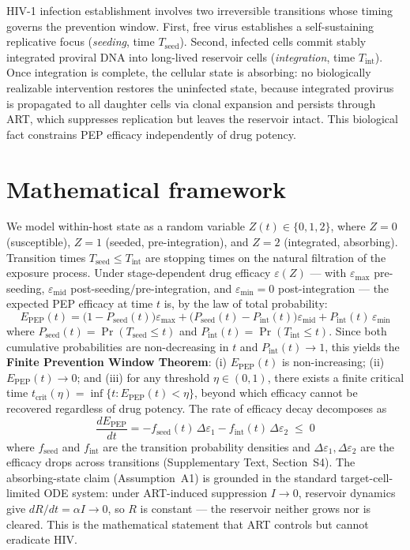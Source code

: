 \documentclass[10pt,letterpaper]{article}
\theoremstyle{definition}
\theoremstyle{remark}
\newcommand{\Tseed}{T_{\text{seed}}}
\newcommand{\Tint}{T_{\text{int}}}
\newcommand{\Pseed}{P_{\text{seed}}}
\newcommand{\Pint}{P_{\text{int}}}
\newcommand{\Epep}{E_{\text{PEP}}}
\newcommand{\tcrit}{t_{\text{crit}}}
\newcommand{\emax}{\varepsilon_{\max}}
\newcommand{\emid}{\varepsilon_{\text{mid}}}
\newcommand{\emin}{\varepsilon_{\min}}
\begin{document}
HIV-1 infection establishment involves two irreversible transitions whose timing governs the prevention window. First, free virus establishes a self-sustaining replicative focus (\emph{seeding}, time $\Tseed$). Second, infected cells commit stably integrated proviral DNA into long-lived reservoir cells (\emph{integration}, time $\Tint$). Once integration is complete, the cellular state is absorbing: no biologically realizable intervention restores the uninfected state, because integrated provirus is propagated to all daughter cells via clonal expansion\cite{chun1995,siliciano2005} and persists through ART, which suppresses replication but leaves the reservoir intact\cite{perelson1997}. This biological fact constrains PEP efficacy independently of drug potency.


\section*{Mathematical framework}

We model within-host state as a random variable $Z(t) \in \{0, 1, 2\}$, where $Z=0$ (susceptible), $Z=1$ (seeded, pre-integration), and $Z=2$ (integrated, absorbing). Transition times $\Tseed \leq \Tint$ are stopping times on the natural filtration of the exposure process. Under stage-dependent drug efficacy $\varepsilon(Z)$ --- with $\emax$ pre-seeding, $\emid$ post-seeding/pre-integration, and $\emin = 0$ post-integration --- the expected PEP efficacy at time $t$ is, by the law of total probability:
\begin{equation}
\Epep(t) = \big(1 - \Pseed(t)\big)\emax + \big(\Pseed(t) - \Pint(t)\big)\emid + \Pint(t)\,\emin
\label{eq:master}
\end{equation}
where $\Pseed(t) = \Pr(\Tseed \leq t)$ and $\Pint(t) = \Pr(\Tint \leq t)$. Since both cumulative probabilities are non-decreasing in $t$ and $\Pint(t) \to 1$, this yields the \textbf{Finite Prevention Window Theorem}: (i) $\Epep(t)$ is non-increasing; (ii) $\Epep(t) \to 0$; and (iii) for any threshold $\eta \in (0,1)$, there exists a finite critical time $\tcrit(\eta) = \inf\{t : \Epep(t) < \eta\}$, beyond which efficacy cannot be recovered regardless of drug potency. The rate of efficacy decay decomposes as
\begin{equation}
\frac{d\Epep}{dt} = -f_{\text{seed}}(t)\,\Delta\varepsilon_{1} - f_{\text{int}}(t)\,\Delta\varepsilon_{2} \;\leq\; 0
\label{eq:hazard}
\end{equation}
where $f_{\text{seed}}$ and $f_{\text{int}}$ are the transition probability densities and $\Delta\varepsilon_{1}, \Delta\varepsilon_{2}$ are the efficacy drops across transitions (Supplementary Text, Section~S4). The absorbing-state claim (Assumption~A1) is grounded in the standard target-cell-limited ODE system\cite{perelson1996}: under ART-induced suppression $I \to 0$, reservoir dynamics give $dR/dt = \alpha I \to 0$, so $R$ is constant --- the reservoir neither grows nor is cleared. This is the mathematical statement that ART controls but cannot eradicate HIV.
\end{document}
